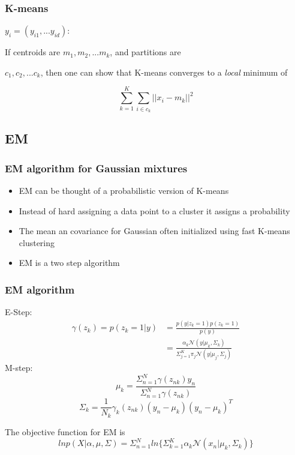\documentclass[11pt]{beamer}
\begin{document}
\begin{frame}
\frametitle{K-means}
$y_i = (y_{i1}, ... y_{id})$:

If centroids are $m_1, m_2, ... m_k$, and partitions are

$c_1, c_2, ... c_k$, then one can show that K-means converges to a {\it local} minimum of

\[
\sum^K_{k=1} \sum_{i\in c_k} || x_i - m_k ||^2
\]

\end{frame}

\subsection{EM}
\begin{frame}
\frametitle{EM algorithm for Gaussian mixtures}
\begin{itemize}
\item EM can be thought of a probabilistic version of K-means
\item Instead of hard assigning a data point to a cluster it assigns a probability
\item The mean an covariance for Gaussian often initialized using fast K-means clustering
\item EM is a two step algorithm
\end{itemize}

\end{frame}

\begin{frame}
\frametitle{EM algorithm}
E-Step:\\
\[\begin{split}
\gamma (z_k) = p(z_k=1|y) 
&= \frac{p(y|z_k=1)p(z_k=1)}{p(y)} \\
&= \frac{\alpha_k\mathcal{N}(y|\mu_k, \Sigma_k)}{\Sigma^K_{j=1}\pi_j\mathcal{N}(y|\mu_j,\Sigma_j)}
\end{split}
\]
M-step:\\
\[
\mu_k=\frac{\Sigma^{N}_{n=1}\gamma(z_{nk})y_n}{\Sigma^{N}_{n=1}\gamma(z_{nk})}
\]
\[
\Sigma_k=\frac{1}{N_k}\gamma_k(z_{nk})(y_n-\mu_k)(y_n-\mu_k)^T
\]
\end{frame}

\begin{frame}
The objective function for EM is
\[
lnp(X|\alpha,\mu,\Sigma)=\Sigma^N_{n=1}ln\{\Sigma^K_{k=1}\alpha_k
\mathcal{N}(x_n|\mu_k,\Sigma_k)\}
\]
\end{frame}
\end{document}
